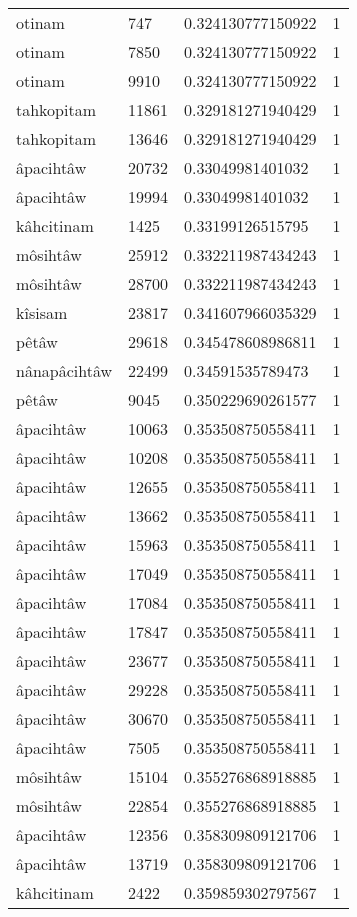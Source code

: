 \begin{longtable}{llll}
otinam & 747 & 0.324130777150922 & 1 \\
otinam & 7850 & 0.324130777150922 & 1 \\
otinam & 9910 & 0.324130777150922 & 1 \\
tahkopitam & 11861 & 0.329181271940429 & 1 \\
tahkopitam & 13646 & 0.329181271940429 & 1 \\
âpacihtâw & 20732 & 0.33049981401032 & 1 \\
âpacihtâw & 19994 & 0.33049981401032 & 1 \\
kâhcitinam & 1425 & 0.33199126515795 & 1 \\
môsihtâw & 25912 & 0.332211987434243 & 1 \\
môsihtâw & 28700 & 0.332211987434243 & 1 \\
kîsisam & 23817 & 0.341607966035329 & 1 \\
pêtâw & 29618 & 0.345478608986811 & 1 \\
nânapâcihtâw & 22499 & 0.34591535789473 & 1 \\
pêtâw & 9045 & 0.350229690261577 & 1 \\
âpacihtâw & 10063 & 0.353508750558411 & 1 \\
âpacihtâw & 10208 & 0.353508750558411 & 1 \\
âpacihtâw & 12655 & 0.353508750558411 & 1 \\
âpacihtâw & 13662 & 0.353508750558411 & 1 \\
âpacihtâw & 15963 & 0.353508750558411 & 1 \\
âpacihtâw & 17049 & 0.353508750558411 & 1 \\
âpacihtâw & 17084 & 0.353508750558411 & 1 \\
âpacihtâw & 17847 & 0.353508750558411 & 1 \\
âpacihtâw & 23677 & 0.353508750558411 & 1 \\
âpacihtâw & 29228 & 0.353508750558411 & 1 \\
âpacihtâw & 30670 & 0.353508750558411 & 1 \\
âpacihtâw & 7505 & 0.353508750558411 & 1 \\
môsihtâw & 15104 & 0.355276868918885 & 1 \\
môsihtâw & 22854 & 0.355276868918885 & 1 \\
âpacihtâw & 12356 & 0.358309809121706 & 1 \\
âpacihtâw & 13719 & 0.358309809121706 & 1 \\
kâhcitinam & 2422 & 0.359859302797567 & 1 \\

\end{longtable}
